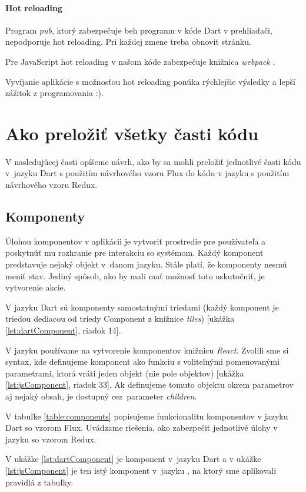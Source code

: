 \paragraph{Hot reloading}
Program \emph{pub}, ktorý zabezpečuje beh programu v kóde Dart v prehliadači, nepodporuje hot reloading. Pri každej zmene treba obnoviť stránku.

Pre JavaScript hot reloading v našom kóde zabezpečuje knižnica \emph{webpack} \cite{webpack}.

Vyvíjanie aplikácie s možnosťou hot reloading ponúka rýchlejšie výsledky a lepší zážitok z programovania :).

\section{Ako preložiť všetky časti kódu}

V nasledujúcej časti opíšeme návrh, ako by sa mohli preložiť jednotlivé časti kódu v~jazyku Dart s použitím návrhového vzoru Flux do kódu v jazyku \JS{} s použitím návrhového vzoru Redux.

\subsection{Komponenty}
Úlohou komponentov v aplikácii je vytvoriť prostredie pre používateľa a poskytnúť mu rozhranie pre interakciu so systémom. Každý komponent predstavuje nejaký objekt v~danom jazyku. 
Stále platí, že komponenty nesmú meniť stav. Jediný spôsob, ako by mali mať možnosť toto uskutočniť, je vytvorenie akcie.

V jazyku Dart sú komponenty samostatnými triedami (každý komponent je triedou dediacou od triedy Component z knižnice \emph{tiles}) [ukážka \ref{lst:dartComponent}, riadok 14].

V jazyku \JS{} používame na vytvorenie komponentov knižnicu \emph{React}. Zvolili sme si syntax, kde definujeme komponent ako funkciu s voliteľnými pomenovanými parametrami, ktorá vráti jeden objekt (nie pole objektov) [ukážka \ref{lst:jsComponent}, riadok 33]. 
Ak definujeme tomuto objektu okrem parametrov aj nejaký obsah, je dostupný cez~parameter \emph{children}.

V tabuľke \ref{table:components} popisujeme funkcionalitu komponentov v jazyku Dart so vzorom Flux. Uvádzame riešenia, ako zabezpečiť jednotlivé úlohy v jazyku \JS{} so vzorom Redux.

V ukážke \ref{lst:dartComponent} je komponent v~jazyku Dart a v ukážke \ref{lst:jsComponent} je ten istý komponent v~jazyku \JS{}, na ktorý sme aplikovali pravidlá z tabuľky.


